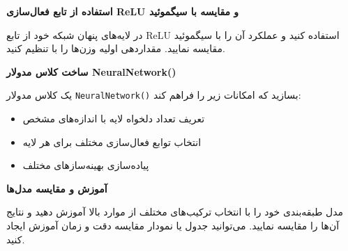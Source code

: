 \documentclass[12pt]{exam}
\begin{document}
\begin{questions}
		\question
		\textbf{استفاده از تابع فعال‌سازی ReLU و مقایسه با سیگموئید}
		
		در لایه‌های پنهان شبکه خود از تابع ReLU استفاده کنید و عملکرد آن را با سیگموئید مقایسه نمایید. مقداردهی اولیه وزن‌ها را با  تنظیم کنید.

		
		
		
		\question
		\textbf{ساخت کلاس مدولار NeuralNetwork()}
		
		یک کلاس مدولار \verb|NeuralNetwork()| بسازید که امکانات زیر را فراهم کند:
		\begin{itemize}
			\item تعریف تعداد دلخواه لایه با اندازه‌های مشخص
			\item انتخاب توابع فعال‌سازی مختلف برای هر لایه 
			\item پیاده‌سازی بهینه‌سازهای مختلف
		\end{itemize}
		
		
		
		
		\question
		\textbf{آموزش و مقایسه مدل‌ها}
		
		مدل طبقه‌بندی خود را با انتخاب ترکیب‌های مختلف از موارد بالا آموزش دهید و نتایج آن‌ها را مقایسه نمایید. می‌توانید جدول یا نمودار مقایسه دقت و زمان آموزش ایجاد کنید.
		

		
		
	\end{questions}
	
\end{document}
